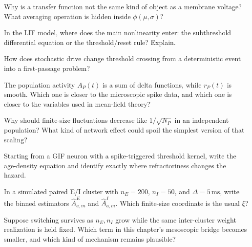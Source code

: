 \begin{conceptquestions}
  \item Why is a transfer function not the same kind of object as a membrane
  voltage? What averaging operation is hidden inside $\phi(\mu,\sigma)$?

  \item In the LIF model, where does the main nonlinearity enter: the
  subthreshold differential equation or the threshold/reset rule? Explain.

  \item How does stochastic drive change threshold crossing from a deterministic
  event into a first-passage problem?

  \item The population activity $A_P(t)$ is a sum of delta functions, while
  $r_P(t)$ is smooth. Which one is closer to the microscopic spike data, and
  which one is closer to the variables used in mean-field theory?

  \item Why should finite-size fluctuations decrease like $1/\sqrt{N_P}$ in an
  independent population? What kind of network effect could spoil the simplest
  version of that scaling?

  \item Starting from a GIF neuron with a spike-triggered threshold kernel,
  write the age-density equation and identify exactly where refractoriness
  changes the hazard.

  \item In a simulated paired E/I cluster with \(n_E=200\), \(n_I=50\), and
  \(\Delta=5\,\mathrm{ms}\), write the binned estimators
  \(\widehat A_{a,m}^E\) and \(\widehat A_{a,m}^I\). Which finite-size
  coordinate is the usual \(\xi\)?

  \item Suppose switching survives as \(n_E,n_I\) grow while the same
  inter-cluster weight realization is held fixed. Which term in this chapter's
  mesoscopic bridge becomes smaller, and which kind of mechanism remains
  plausible?
\end{conceptquestions}

